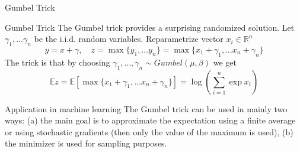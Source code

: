 \documentclass{beamer}
\begin{document}
\begin{frame}{Gumbel Trick}
    \begin{block}{Gumbel Trick}
        The Gumbel trick provides a surprising randomized solution. Let $\gamma_1, \ldots \gamma_n$ be the i.i.d. random variables. Reparametrize vector $x_i \in \mathbb{R}^n$
        \[y = x + \gamma, \quad z = \max\{y_1, \ldots y_n\} = \max\{x_1 + \gamma_1, \ldots x_n + \gamma_n\}\]
        The trick is that by choosing $\gamma_1, \ldots, \gamma_n \sim Gumbel(\mu, \beta)$ we get
        \[\mathbb{E}z = \mathbb{E}[\max\{x_1 + \gamma_1, \ldots x_n + \gamma_n\}] = \log\left(\sum_{i=1}^n\exp{x_i}\right)\]
    \end{block}
    
    \begin{block}{Application in machine learning}
        The Gumbel trick can be used in mainly two ways: (a) the main goal is to approximate the expectation using a finite average or using stochastic gradients (then only the value of the maximum is used), (b) the minimizer is used for sampling purposes.
    \end{block}
\end{frame}
\end{document}

